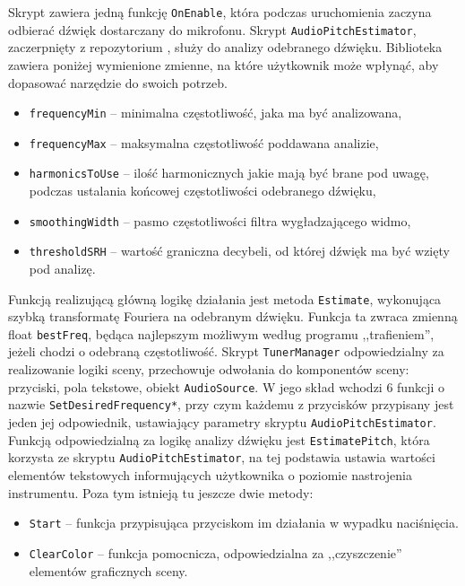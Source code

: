 Skrypt zawiera jedną funkcję \texttt{OnEnable}, która podczas uruchomienia zaczyna odbierać dźwięk dostarczany do mikrofonu. Skrypt \texttt{AudioPitchEstimator}, zaczerpnięty z repozytorium \cite{https://github.com/nakakq/AudioPitchEstimatorForUnity}, %
służy do analizy odebranego dźwięku. Biblioteka zawiera poniżej wymienione zmienne, na które użytkownik może wpłynąć, aby dopasować narzędzie do swoich potrzeb.
\begin{itemize}
    \item \texttt{frequencyMin} -- minimalna częstotliwość, jaka ma być analizowana,
    \item \texttt{frequencyMax} -- maksymalna częstotliwość poddawana analizie,
    \item \texttt{harmonicsToUse} -- ilość harmonicznych jakie mają być brane pod uwagę, podczas ustalania końcowej częstotliwości odebranego dźwięku,
    \item \texttt{smoothingWidth} -- pasmo częstotliwości filtra wygładzającego widmo,
    \item \texttt{thresholdSRH} -- wartość graniczna decybeli, od której dźwięk ma być wzięty pod analizę.
\end{itemize}

Funkcją realizującą główną logikę działania jest metoda \texttt{Estimate}, wykonująca szybką transformatę Fouriera na odebranym dźwięku. Funkcja ta zwraca zmienną float \texttt{bestFreq}, będąca najlepszym możliwym według programu ,,trafieniem'', jeżeli chodzi o odebraną częstotliwość. Skrypt \texttt{TunerManager} odpowiedzialny za realizowanie logiki sceny, przechowuje odwołania do komponentów sceny: przyciski, pola tekstowe, obiekt \texttt{AudioSource}. W jego skład wchodzi 6 funkcji o nazwie \texttt{SetDesiredFrequency*}, przy czym każdemu z przycisków przypisany jest jeden jej odpowiednik, ustawiający parametry skryptu \texttt{AudioPitchEstimator}. Funkcją odpowiedzialną za logikę analizy dźwięku jest \texttt{EstimatePitch}, która korzysta ze skryptu \texttt{AudioPitchEstimator}, na tej podstawia ustawia wartości elementów tekstowych informujących użytkownika o poziomie nastrojenia instrumentu. Poza tym istnieją tu jeszcze dwie metody:

\begin{itemize}
    \item \texttt{Start} -- funkcja przypisująca przyciskom im działania w wypadku naciśnięcia.
    \item \texttt{ClearColor} -- funkcja pomocnicza, odpowiedzialna za ,,czyszczenie'' elementów graficznych sceny.
\end{itemize}

